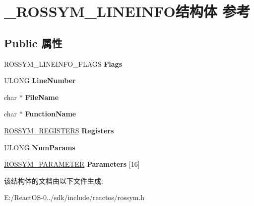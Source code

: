 \hypertarget{struct___r_o_s_s_y_m___l_i_n_e_i_n_f_o}{}\section{\+\_\+\+R\+O\+S\+S\+Y\+M\+\_\+\+L\+I\+N\+E\+I\+N\+F\+O结构体 参考}
\label{struct___r_o_s_s_y_m___l_i_n_e_i_n_f_o}
\subsection*{Public 属性}
\begin{DoxyCompactItemize}
\item 
\mbox{\label{struct___r_o_s_s_y_m___l_i_n_e_i_n_f_o_a90cdb843081a130fd4ea28ecedd92ee1}} 
R\+O\+S\+S\+Y\+M\+\_\+\+L\+I\+N\+E\+I\+N\+F\+O\+\_\+\+F\+L\+A\+GS {\bfseries Flags}
\item 
\mbox{\label{struct___r_o_s_s_y_m___l_i_n_e_i_n_f_o_a0e2e06ecc121756ce8e7f0a8a0f05e8e}} 
U\+L\+O\+NG {\bfseries Line\+Number}
\item 
\mbox{\label{struct___r_o_s_s_y_m___l_i_n_e_i_n_f_o_a27b01e3cb25e2b2ac65bc424bf549734}} 
char $\ast$ {\bfseries File\+Name}
\item 
\mbox{\label{struct___r_o_s_s_y_m___l_i_n_e_i_n_f_o_a20153ceb0564a0634479860f45af64b8}} 
char $\ast$ {\bfseries Function\+Name}
\item 
\mbox{\label{struct___r_o_s_s_y_m___l_i_n_e_i_n_f_o_a58ba62169b115ea7973bbeabc203bbfc}} 
\hyperlink{struct___r_o_s_s_y_m___r_e_g_i_s_t_e_r_s}{R\+O\+S\+S\+Y\+M\+\_\+\+R\+E\+G\+I\+S\+T\+E\+RS} {\bfseries Registers}
\item 
\mbox{\label{struct___r_o_s_s_y_m___l_i_n_e_i_n_f_o_ab6279bcccaa26b61563e51114cddece9}} 
U\+L\+O\+NG {\bfseries Num\+Params}
\item 
\mbox{\label{struct___r_o_s_s_y_m___l_i_n_e_i_n_f_o_a7697d35ef25691e315e9eaf49e772e2c}} 
\hyperlink{struct___r_o_s_s_y_m___p_a_r_a_m_e_t_e_r}{R\+O\+S\+S\+Y\+M\+\_\+\+P\+A\+R\+A\+M\+E\+T\+ER} {\bfseries Parameters} \mbox{[}16\mbox{]}
\end{DoxyCompactItemize}


该结构体的文档由以下文件生成\+:\begin{DoxyCompactItemize}
\item 
E\+:/\+React\+O\+S-\/0../sdk/include/reactos/rossym.\+h\end{DoxyCompactItemize}
